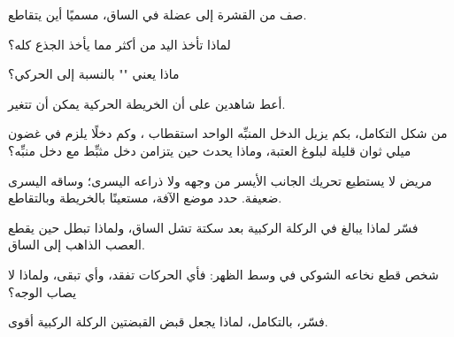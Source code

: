 \begin{exercise}[$\star$]\label{exo:g12:brain-and-movement:2}
صف  من القشرة إلى عضلة في الساق، مسميًا أين
يتقاطع.
\end{exercise}

\begin{exercise}[$\star$]\label{exo:g12:brain-and-movement:3}
لماذا تأخذ اليد من  أكثر مما يأخذ الجذع كله؟
\end{exercise}

\begin{exercise}[$\star$]\label{exo:g12:brain-and-movement:4}
ماذا يعني "" بالنسبة إلى  الحركي؟
\end{exercise}

\begin{exercise}[$\star$]\label{exo:g12:brain-and-movement:5}
أعط شاهدين على أن الخريطة الحركية يمكن أن تتغير.
\end{exercise}

\begin{exercise}[$\star\star$]\label{exo:g12:brain-and-movement:6}
من شكل التكامل، بكم يزيل الدخل المنبِّه الواحد استقطاب ، وكم
دخلًا يلزم في غضون ميلي ثوان قليلة لبلوغ العتبة، وماذا يحدث حين يتزامن
دخل مثبِّط مع دخل منبِّه؟
\end{exercise}

\begin{exercise}[$\star\star$]\label{exo:g12:brain-and-movement:7}
مريض لا يستطيع تحريك الجانب الأيسر من وجهه ولا ذراعه اليسرى؛ وساقه
اليسرى ضعيفة. حدد موضع الآفة، مستعينًا بالخريطة وبالتقاطع.
\end{exercise}

\begin{exercise}[$\star\star$]\label{exo:g12:brain-and-movement:8}
فسّر لماذا يبالغ في الركلة الركبية بعد سكتة تشل الساق، ولماذا تبطل حين
يقطع العصب الذاهب إلى الساق.
\end{exercise}

\begin{exercise}[$\star\star$]\label{exo:g12:brain-and-movement:9}
شخص قطع نخاعه الشوكي في وسط الظهر: فأي الحركات تفقد، وأي 
تبقى، ولماذا لا يصاب الوجه؟
\end{exercise}

\begin{exercise}[$\star\star$]\label{exo:g12:brain-and-movement:10}
فسّر، بالتكامل، لماذا يجعل قبض القبضتين الركلة الركبية أقوى.
\end{exercise}


